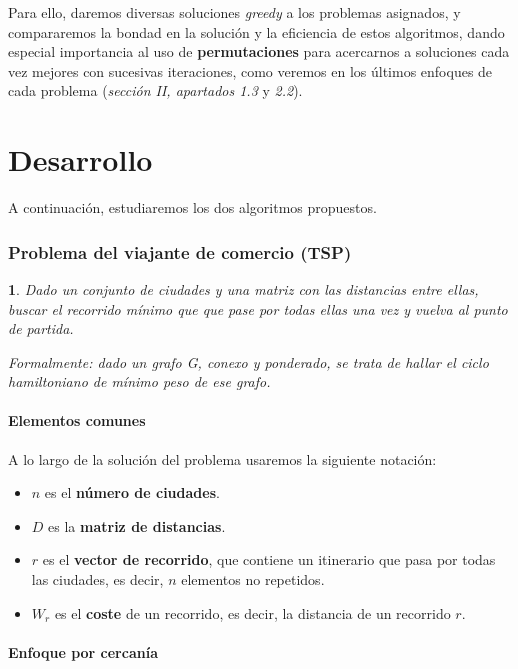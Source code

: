 \documentclass[10pt, a4paper]{article}
\theoremstyle{theorem-style}
\newtheorem*{datos}{}
\theoremstyle{theorem-style}
\theoremstyle{definition-style}
\theoremstyle{remark-style}
\theoremstyle{example-style}
\theoremstyle{definition-style}
\theoremstyle{remark-style}
\begin{document}
Para ello, daremos diversas soluciones \emph{greedy} a los problemas asignados, y compararemos la bondad en la solución y la eficiencia de estos algoritmos, dando especial importancia al uso de \textbf{permutaciones} para acercarnos a soluciones cada vez mejores con sucesivas iteraciones, como veremos en los últimos enfoques de cada problema (\emph{sección II, apartados 1.3} y \emph{2.2}).

\pagebreak
\part{Desarrollo}

A continuación, estudiaremos los dos algoritmos propuestos.

\section{Problema del viajante de comercio (TSP)}

\begin{datos}
	{\sffamily Dado un conjunto de ciudades y una matriz con las distancias entre ellas, buscar el recorrido mínimo que que pase por todas ellas una vez y vuelva al punto de partida.
	
	Formalmente: dado un grafo \emph{G}, conexo y ponderado, se trata de hallar el \emph{ciclo hamiltoniano} de mínimo peso de ese grafo.}
\end{datos}

\subsection*{Elementos comunes}

A lo largo de la solución del problema usaremos la siguiente notación:

\begin{itemize}
	\item $n$ es el \textbf{número de ciudades}.
	\item $D$ es la \textbf{matriz de distancias}.
	\item $r$ es el \textbf{vector de recorrido}, que contiene un itinerario que pasa por todas las ciudades, es decir, $n$ elementos no repetidos.
	\item $W_r$ es el \textbf{coste} de un recorrido, es decir, la distancia de un recorrido $r$.
\end{itemize}

\subsection{Enfoque por cercanía}
\end{document}
